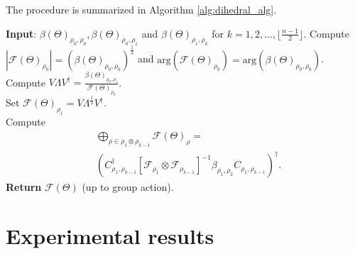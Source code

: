 \documentclass{article}
\theoremstyle{plain}
\theoremstyle{definition}
\theoremstyle{remark}
\begin{document}
The procedure is summarized in Algorithm \ref{alg:dihedral_alg}.
\begin{algorithm}[tb]
    \caption{Bispectrum inversion on the dihedral group $D_n$.}\label{alg:dihedral_alg}
    \begin{algorithmic}[1]
        \STATE \textbf{Input}: $\beta(\Theta)_{\rho_0,\rho_0}, \beta(\Theta)_{\rho_0,\rho_1}$ and $ \beta(\Theta)_{\rho_1,\rho_k}$ for $k=1,2,...,\lfloor\frac{n-1}{2}\rfloor$.
        \STATE Compute $|\mathcal{F}(\Theta)_{\rho_0}|=\left(\beta(\Theta)_{\rho_0,\rho_0}\right)^{\frac{1}{3}}$ and $\mathrm{arg}(\mathcal{F}(\Theta)_{\rho_0})=\mathrm{arg}(\beta(\Theta)_{\rho_0,\rho_0})$.
        \STATE Compute $V\Lambda V^\dagger = \frac{\beta(\Theta)_{\rho_0,\rho_1}} {\mathcal{F}(\Theta)_{\rho_0}}$.\\
        \STATE Set $\mathcal{F}(\Theta)_{\rho_1} = V\Lambda^\frac{1}{2} V^\dagger$.\\
            \STATE Compute \begin{align*}
                &\bigoplus_{\rho\in\rho_1\otimes\rho_{k-1}}\mathcal{F}(\Theta)_\rho =\\
                \nonumber
                &\left(C_{\rho_1,\rho_{k-1}}^{\dagger}\left[\mathcal{F}_{\rho_1}\otimes\mathcal{F}_{\rho_{k-1}}\right]^{-1}\beta_{\rho_1,\rho_2}C_{\rho_1,\rho_{k-1}}\right)^\dagger.
            \end{align*}
        \ENDFOR
        \STATE \textbf{Return} $\mathcal{F}(\Theta)$ (up to group action).
    \end{algorithmic}
\end{algorithm}
\section{Experimental results}\label{sec:experiments}
\end{document}
